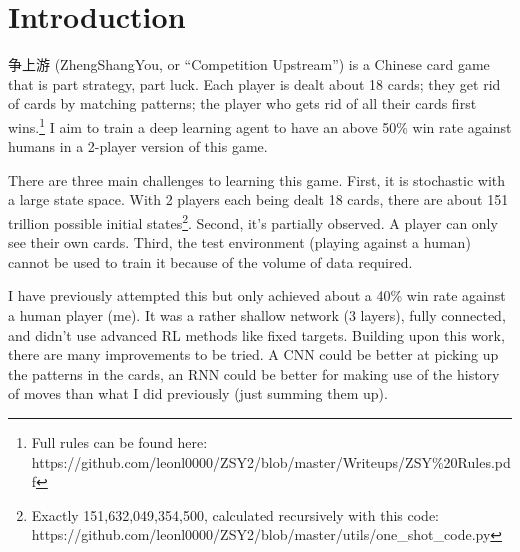 \documentclass{article}
\begin{document}
\begin{abstract}
To learn a 2-player card game without significant recorded data, an agent must play against other agents to produce data, making its training environment different from its test environment. However, it also allows for different models to be simulated in tandem and tested against each other, improving data efficiency and exploration.\\
I leveraged this exploration and simulation efficiency is to try out more, different models and aggregation models. The result is an agent that seems to have acheived human level performance on the card game ZSY.
\end{abstract}


\section{Introduction}
争上游 (ZhengShangYou, or “Competition Upstream”) is a Chinese card game that is part strategy, part luck. Each player is dealt about 18 cards; they get rid of cards by matching patterns; the player who gets rid of all their cards first wins.\footnote{Full rules can be found here:\\ https://github.com/leonl0000/ZSY2/blob/master/Writeups/ZSY\%20Rules.pdf} I aim to train a deep learning agent to have an above 50\% win rate against humans in a 2-player version of this game.

There are three main challenges to learning this game. First, it is stochastic with a large state space. With 2 players each being dealt 18 cards, there are about 151 trillion possible initial states\footnote{Exactly 151,632,049,354,500, calculated recursively with this code: https://github.com/leonl0000/ZSY2/blob/master/utils/one\_shot\_code.py}. Second, it’s partially observed. A player can only see their own cards. Third, the test environment (playing against a human) cannot be used to train it because of the volume of data required.

I have previously attempted this but only achieved about a 40\% win rate against a human player (me). It was a rather shallow network (3 layers), fully connected, and didn’t use advanced RL methods like fixed targets. Building upon this work, there are many improvements to be tried. A CNN could be better at picking up the patterns in the cards, an RNN could be better for making use of the history of moves than what I did previously (just summing them up). 
\end{document}
